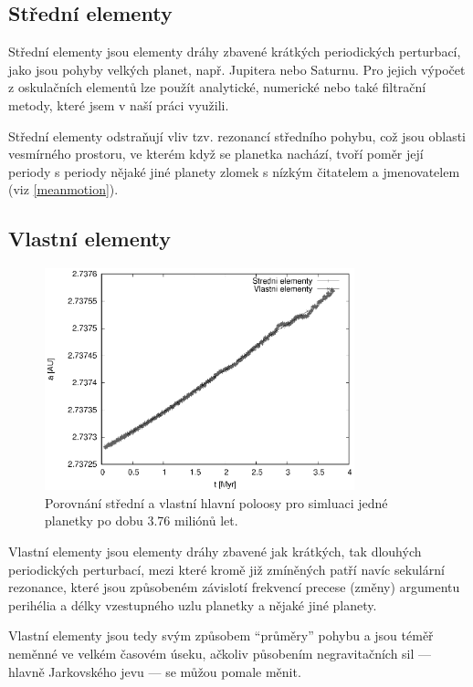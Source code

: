 \documentclass[A4paper, 12pt, oneside]{book}
\begin{document}
\subsection{Střední elementy}
Střední elementy jsou elementy dráhy zbavené krátkých periodických perturbací, jako jsou pohyby velkých planet, např. Jupitera nebo Saturnu. Pro jejich výpočet z oskulačních elementů lze použít analytické, numerické nebo také filtrační metody, které jsem v naší práci využili. 

Střední elementy odstraňují vliv tzv. rezonancí středního pohybu, což jsou oblasti vesmírného prostoru, ve kterém když se planetka nachází, tvoří poměr její periody s periody nějaké jiné planety zlomek s nízkým čitatelem a jmenovatelem (viz \ref{meanmotion}). 
\subsection{Vlastní elementy}

\begin{figure}
	\centering
	\includegraphics[width=0.8\textwidth]{obr/atFP}
	\caption{Porovnání střední a vlastní hlavní poloosy pro simluaci jedné planetky po dobu 3.76 miliónů let.}
	\label{atFP}
\end{figure}

Vlastní elementy jsou elementy dráhy zbavené jak krátkých, tak dlouhých periodických perturbací, mezi které kromě již zmíněných patří navíc sekulární rezonance, které jsou způsobeném závislotí frekvencí precese (změny) argumentu perihélia a délky vzestupného uzlu planetky a nějaké jiné planety. 

Vlastní elementy jsou tedy svým způsobem \enquote{průměry} pohybu a jsou téměř neměnné ve velkém časovém úseku, ačkoliv působením negravitačních sil --- hlavně Jarkovského jevu --- se můžou pomale měnit. 
\end{document}
